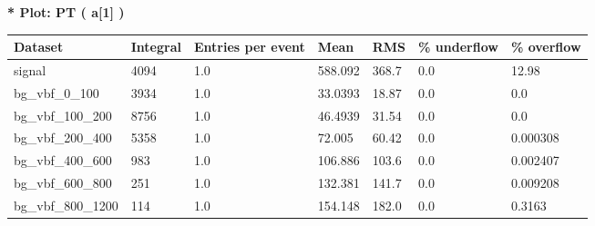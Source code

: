 \documentclass[a4paper, 10pt]{article}
\begin{document}
\textbf{* Plot: PT ( a[1] ) }\\
   \begin{table}[H]
  \begin{center}
    \begin{tabular}{|m{23.0mm}|m{23.0mm}|m{18.0mm}|m{19.0mm}|m{19.0mm}|m{19.0mm}|m{19.0mm}|}
      \hline
      {\cellcolor{yellow}         Dataset}& {\cellcolor{yellow}         Integral}& {\cellcolor{yellow}         Entries per event}& {\cellcolor{yellow}         Mean}& {\cellcolor{yellow}         RMS}& {\cellcolor{yellow}         \% underflow}& {\cellcolor{yellow}         \% overflow}\\
      \hline
      {\cellcolor{white}         signal}& {\cellcolor{white}         4094}& {\cellcolor{white}         1.0}& {\cellcolor{white}         588.092}& {\cellcolor{white}         368.7}& {\cellcolor{orange}         0.0}& {\cellcolor{orange}         12.98}\\
      \hline
      {\cellcolor{white}         bg\_vbf\_0\_100}& {\cellcolor{white}         3934}& {\cellcolor{white}         1.0}& {\cellcolor{white}         33.0393}& {\cellcolor{white}         18.87}& {\cellcolor{green}         0.0}& {\cellcolor{green}         0.0}\\
      \hline
      {\cellcolor{white}         bg\_vbf\_100\_200}& {\cellcolor{white}         8756}& {\cellcolor{white}         1.0}& {\cellcolor{white}         46.4939}& {\cellcolor{white}         31.54}& {\cellcolor{green}         0.0}& {\cellcolor{green}         0.0}\\
      \hline
      {\cellcolor{white}         bg\_vbf\_200\_400}& {\cellcolor{white}         5358}& {\cellcolor{white}         1.0}& {\cellcolor{white}         72.005}& {\cellcolor{white}         60.42}& {\cellcolor{green}         0.0}& {\cellcolor{green}         0.000308}\\
      \hline
      {\cellcolor{white}         bg\_vbf\_400\_600}& {\cellcolor{white}         983}& {\cellcolor{white}         1.0}& {\cellcolor{white}         106.886}& {\cellcolor{white}         103.6}& {\cellcolor{green}         0.0}& {\cellcolor{green}         0.002407}\\
      \hline
      {\cellcolor{white}         bg\_vbf\_600\_800}& {\cellcolor{white}         251}& {\cellcolor{white}         1.0}& {\cellcolor{white}         132.381}& {\cellcolor{white}         141.7}& {\cellcolor{green}         0.0}& {\cellcolor{green}         0.009208}\\
      \hline
      {\cellcolor{white}         bg\_vbf\_800\_1200}& {\cellcolor{white}         114}& {\cellcolor{white}         1.0}& {\cellcolor{white}         154.148}& {\cellcolor{white}         182.0}& {\cellcolor{green}         0.0}& {\cellcolor{green}         0.3163}\\

\end{tabular}
\end{center}
\end{table}
\end{document}

